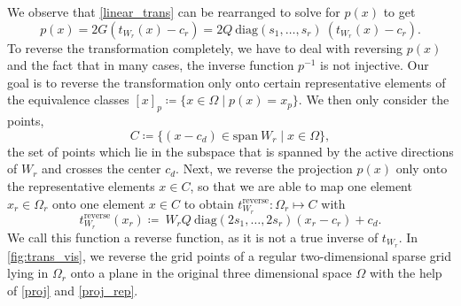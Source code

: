 \documentclass[
  a4paper,  %
  twoside,  %
  bibliography=totoc,
  headsepline,
  cleardoublepage=empty,
  parskip=half,
  draft=false
]{scrbook}
\begin{document}
We observe that \cref{linear_trans} can be rearranged to solve for $p(x)$ to get
\begin{equation}
p(x)=2 G (t_{W_r}(x) - c_r)=2 Q ~ \text{diag}(s_1, \dots, s_r) ~ (t_{W_r}(x) - c_r).
\label{proj}
\end{equation}
To reverse the transformation completely, we have to deal with reversing $p(x)$ and the fact that in many cases, the inverse function $p^{-1}$ is not injective.
Our goal is to reverse the transformation only onto certain representative elements of the equivalence classes $[x]_p \coloneqq \{x \in \Omega \mid p(x)=x_{p}\}$.
We then only consider the points,
\begin{equation}
C \coloneqq \{(x - c_d) \in \text{span} ~ W_r \mid x \in \Omega\},
\label{proj_rep}
\end{equation}
\ie the set of points which lie in the subspace that is spanned by the active directions of $W_r$ and crosses the center $c_d$.
Next, we reverse the projection $p(x)$ only onto the representative elements $x \in C$, so that we are able to map one element $x_r \in \Omega_r$ onto one element $x \in C$ to obtain $t_{W_r}^{\text{reverse}}\colon \Omega_r \mapsto C$ with
\begin{equation}
t_{W_r}^{\text{reverse}}(x_r) \coloneqq ~W_r Q ~ \text{diag}\left(2s_1, \dots, 2s_r\right) (x_r - c_r) + c_d.
\end{equation}
%
We call this function a reverse function, as it is not a true inverse of $t_{W_r}$.
In \cref{fig:trans_vis}, we reverse the grid points of a regular two-dimensional sparse grid lying in $\Omega_r$ onto a plane in the original three dimensional space $\Omega$ with the help of \cref{proj} and \cref{proj_rep}.
\end{document}
